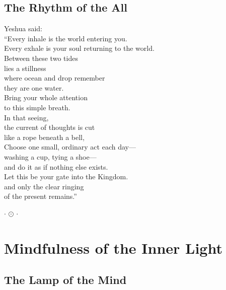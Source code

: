 \documentclass[10pt, openright]{book}
\newcommand{\sectionbreak}{\filbreak}
\newcommand{\ornament}{
    \vspace{1.5cm}
    \begin{center}
        \large \(\cdot\) \(\odot\) \(\cdot\)
    \end{center}
    \vspace{1.5cm}
}
\begin{document}
\sectionbreak

\section{The Rhythm of the All}\label{the-rhythm-of-the-all}

Yeshua said:\\
``Every inhale is the world entering you.\\
Every exhale is your soul returning to the world.\\
Between these two tides\\
lies a stillness\\
where ocean and drop remember\\
they are one water.\\
Bring your whole attention\\
to this simple breath.\\
In that seeing,\\
the current of thoughts is cut\\
like a rope beneath a bell,\\
Choose one small, ordinary act each day---\\
washing a cup, tying a shoe---\\
and do it as if nothing else exists.\\
Let this be your gate into the Kingdom.\\
and only the clear ringing\\
of the present remains.''

\ornament

\chapter{Mindfulness of the Inner
Light}\label{mindfulness-of-the-inner-light}

\sectionbreak

\section{The Lamp of the Mind}\label{the-lamp-of-the-mind}
\end{document}
